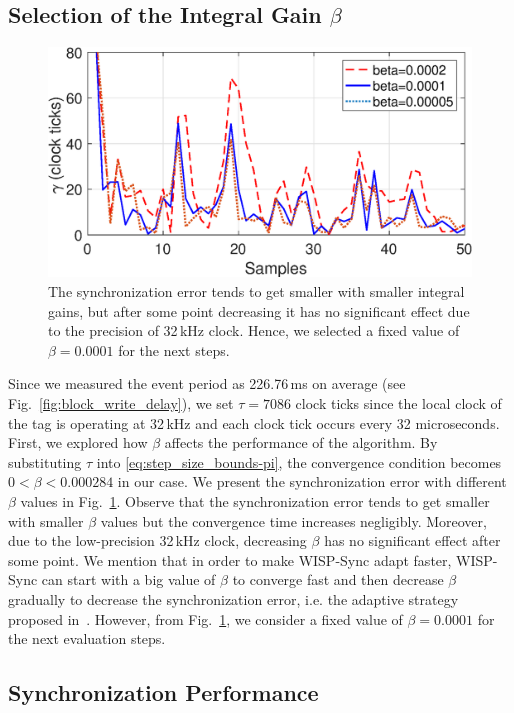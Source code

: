 \documentclass[10pt,journal,compsoc]{IEEEtran}
\begin{document}
\subsection{Selection of the Integral Gain $\beta$} 

\begin{figure}
	\centering
	\includegraphics[width=0.85\columnwidth]{figures/integral_gain.eps}
	\caption{\label{fig:beta} The synchronization error tends to get smaller with smaller integral gains, but after some point decreasing it has no significant effect due to the precision of 32\,kHz clock. Hence, we selected a fixed value of $\beta=0.0001$ for the next steps. }
\end{figure}

Since we measured the event period as 226.76\,ms on average (see Fig.~\ref{fig:block_write_delay}), we set $\tau=7086$ 
clock ticks since the local clock of the tag is operating at 32\,kHz and each clock tick occurs every 32 microseconds. First, we explored how $\beta$ affects the performance of the algorithm. By substituting $\tau$ into \eqref{eq:step_size_bounds-pi}, the convergence condition becomes $0<\beta<0.000284$ in our case. We present the synchronization error with different $\beta$ values in Fig.~\ref{fig:beta}. Observe that the synchronization error tends to get smaller with smaller $\beta$ values but the convergence time increases negligibly. Moreover, due to the low-precision 32\,kHz clock, decreasing $\beta$ has no significant effect after some point. We mention that  in order to make WISP-Sync adapt faster, WISP-Sync can start with a big value of $\beta$ to converge fast and then decrease $\beta$ gradually to decrease the synchronization error, i.e. the adaptive strategy proposed in~\cite{pi2015}. However, from  Fig.~\ref{fig:beta}, we consider a fixed value of $\beta=0.0001$ for the next evaluation steps. 

\subsection{Synchronization Performance}
\end{document}
